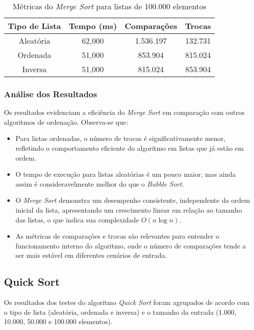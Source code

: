 \documentclass[a4paper,12pt]{article}
\begin{document}
\begin{table}[H]
\centering
\caption{Métricas do \textit{Merge Sort} para listas de 100.000 elementos}
\begin{tabular}{|c|c|c|c|}
\hline
\textbf{Tipo de Lista} & \textbf{Tempo (ms)} & \textbf{Comparações} & \textbf{Trocas} \\ \hline
Aleatória              & 62,000              & 1.536.197            & 132.731         \\ \hline
Ordenada               & 51,000              & 853.904              & 815.024         \\ \hline
Inversa                & 51,000              & 815.024              & 853.904         \\ \hline
\end{tabular}
\end{table}

\subsubsection{Análise dos Resultados}

Os resultados evidenciam a eficiência do \textit{Merge Sort} em comparação com outros algoritmos de ordenação. Observa-se que:

\begin{itemize}
    \item Para listas ordenadas, o número de trocas é significativamente menor, refletindo o comportamento eficiente do algoritmo em listas que já estão em ordem.
    \item O tempo de execução para listas aleatórias é um pouco maior, mas ainda assim é consideravelmente melhor do que o \textit{Bubble Sort}.
    \item O \textit{Merge Sort} demonstra um desempenho consistente, independente da ordem inicial da lista, apresentando um crescimento linear em relação ao tamanho das listas, o que indica sua complexidade $O(n \log n)$.
    \item As métricas de comparações e trocas são relevantes para entender o funcionamento interno do algoritmo, onde o número de comparações tende a ser mais estável em diferentes cenários de entrada.
\end{itemize}

\subsection{Quick Sort}

Os resultados dos testes do algoritmo \textit{Quick Sort} foram agrupados de acordo com o tipo de lista (aleatória, ordenada e inversa) e o tamanho da entrada (1.000, 10.000, 50.000 e 100.000 elementos).
\end{document}
